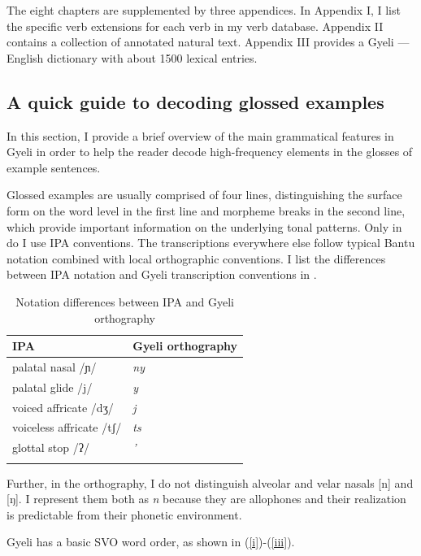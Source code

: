 The eight chapters are supplemented by three appendices. In Appendix I, I list the specific verb extensions for each verb in my verb database. Appendix II contains a collection of annotated natural text. Appendix III provides a Gyeli --- English dictionary with about 1500 lexical entries. 

\subsection{A quick guide to decoding glossed examples}
\label{sec:Guide}

In this section, I provide a brief overview of the main grammatical features in Gyeli in order to help the reader decode high-frequency elements in the glosses of example sentences.

Glossed examples are usually comprised of four lines, distinguishing the surface form on the word level in the first line and morpheme breaks in the second line, which provide important information on the underlying tonal patterns. Only in  do I use IPA conventions. The transcriptions everywhere else follow typical Bantu notation combined with local orthographic conventions. I list the differences between IPA notation and Gyeli transcription conventions in .

\begin{table}
\begin{tabularx}{\textwidth}{XX}
\lsptoprule
IPA & Gyeli orthography \\
\midrule
palatal nasal /ɲ/ & {\itshape ny} \\ 
palatal glide /j/ & {\itshape y} \\ 
voiced affricate /dʒ/ &  {\itshape j}  \\
voiceless affricate /tʃ/ & {\itshape ts} \\ 
glottal stop /ʔ/ &  {\itshape '} \\ 
\lspbottomrule
\end{tabularx}
\caption{Notation differences between IPA and Gyeli orthography}
\label{Tab:notation}
\end{table}

Further, in the orthography, I do not distinguish alveolar and velar nasals [n] and [ŋ]. I represent them both as {\itshape n} because they are allophones and their realization is predictable from their phonetic environment.

Gyeli has a basic SVO word order, as shown in (\ref{i})-(\ref{iii}). 

